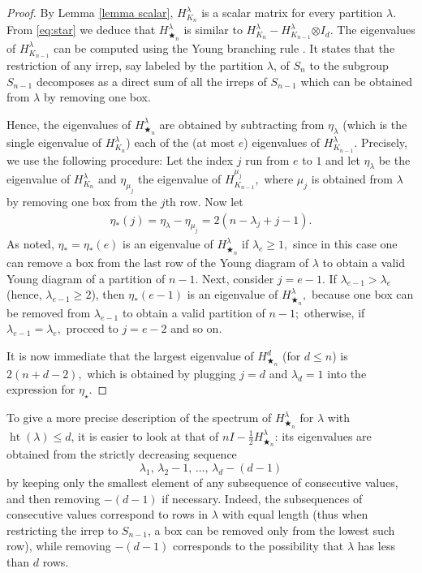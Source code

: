 \documentclass[12pt,dvipsnames,accepted=2016-08-18,a4paper,onecolumn]{quantumarticle}
\def\starn{{\bigstar_{n}}}
\DeclareMathOperator{\het}{ht}
\numberwithin{equation}{section}
\theoremstyle{definition}
\begin{document}
\begin{proof}
By Lemma \ref{lemma scalar}, $H_{K_n}^\lambda$ is a scalar matrix for every partition $\lambda$.
From \eqref{eq:star} we deduce 
that $H_\starn^\lambda$ is similar to $H_{K_n}^\lambda - H_{K_{n-1}}^\lambda {\otimes I_d.}$
The eigenvalues of $H_{K_{n-1}}^\lambda$ can be computed using the Young branching rule \cite[§\,2]{Sag01}. It states that the restriction of any irrep, say labeled by the partition $\lambda$, of $S_n$ to the subgroup $S_{n-1}$ decomposes as a direct sum of all the irreps of $S_{n-1}$ which can be obtained from $\lambda$ by removing one box.

Hence, the eigenvalues of $H_\starn^\lambda$ are obtained by subtracting from $\eta_\lambda$ (which is the single eigenvalue of $H_{K_n}^\lambda$) each of the (at most $e$) eigenvalues of $H_{K_{n-1}}^\lambda.$ 
Precisely, we use the following procedure: Let the index $j$ run from $e$ to $1$ and let 
$\eta_\lambda$ be the eigenvalue of $H_{K_n}^\lambda$ and $\eta_{\mu_j}$ the eigenvalue of $H_{K_{n-1}}^{\mu_j},$ where $\mu_j$ is obtained from $\lambda$ by removing one box from the $j$th row. Now let
\begin{align*}
\eta_*(j) = \eta_\lambda - \eta_{\mu_j} =
     2(n-\lambda_j+j-1).
\end{align*}
As noted, $\eta_* = \eta_*(e)$ is an eigenvalue of $H_\starn^\lambda$ if $\lambda_e \geq 1,$ since in this case one can remove a box from the last row of the Young diagram of $\lambda$ to obtain a valid Young diagram of a partition of $n-1.$ Next, consider $j=e-1.$ If $\lambda_{e-1} > \lambda_e$ (hence, $\lambda_{e-1}\geq 2$), then $\eta_*(e-1)$ is an eigenvalue of $H_\starn^\lambda,$ because one box can be removed from $\lambda_{e-1}$ to obtain a valid partition of $n-1;$ 
otherwise, if $\lambda_{e-1} = \lambda_e,$ proceed to $j=e-2$ and so on.

It is now immediate that the largest eigenvalue of $H_\starn^{d}$ (for $d\le n$) is $2(n+d-2),$ which is obtained by plugging $j=d$ and $\lambda_d=1$ into the expression for $\eta_\star.$
\end{proof}

 




To give a more precise description of the spectrum of $H_\starn^\lambda$ for $\lambda$ with $\het(\lambda) \le d$, it is easier to look at that of $nI-\frac12 H_\starn^\lambda$: its eigenvalues are obtained from the strictly decreasing sequence
$$\lambda_1,\, \lambda_2-1,\, \dots,\, \lambda_d-(d-1)$$
by keeping only the smallest element of any subsequence of consecutive values, and then removing $-(d-1)$ if necessary. Indeed, the subsequences of consecutive values correspond to rows in $\lambda$ with equal length (thus when restricting the irrep to $S_{n-1}$, a box can be removed only from the lowest such row), while removing $-(d-1)$ corresponds to the possibility that $\lambda$ has less than $d$ rows. 
\end{document}
